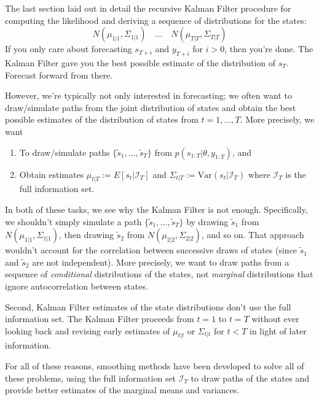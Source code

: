 \documentclass[a4paper,12pt]{article}
\begin{document}
The last section laid out in detail the recursive Kalman Filter
procedure for computing the likelihood and deriving a sequence of
distributions for the states:
\begin{equation}
  \label{distseq}
  N(\mu_{1|1}, \Sigma_{1|1}) \quad \ldots \quad  N(\mu_{T|T}, \Sigma_{T|T})
\end{equation}
If you only care about forecasting $s_{T+i}$ and $y_{T+i}$ for $i>0$,
then you're done.  The Kalman Filter gave you the best possible estimate
of the distribution of $s_T$.  Forecast forward from there.

However, we're typically not only interested in forecasting; we often
want to draw/simulate paths from the joint distribution of states and
obtain the best possible estimates of the distribution of states
from $t=1,\ldots,T$. More precisely, we want 
\begin{enumerate}
  \item To draw/simulate paths $\{\tilde{s}_1,\ldots,\tilde{s}_T\}$
    from $p(s_{1:T}|\theta, y_{1:T})$, and 
  \item Obtain estimates $\mu_{t|T} := E[s_t|\mathcal{I}_T]$ and 
    $\Sigma_{t|T} := \text{Var}(s_t|\mathcal{I}_T)$ where
    $\mathcal{I}_T$ is the full information set.
\end{enumerate}

In both of these tasks, we see why the Kalman Filter is not enough.
Specifically, we shouldn't simply simulate a path
$\{\tilde{s}_1,\ldots,\tilde{s}_T\}$ by drawing $\tilde{s}_1$ from
$N(\mu_{1|1}, \Sigma_{1|1})$, then drawing $\tilde{s}_2$ from
$N(\mu_{2|2}, \Sigma_{2|2})$, and so on. That approach wouldn't account
for the correlation between successive draws of states (since
$\tilde{s}_1$ and $\tilde{s}_2$ are not independent). More precisely, we
want to draw paths from a sequence of \emph{conditional} distributions
of the states, not \emph{marginal} distributions that ignore
autocorrelation between states.

Second, Kalman Filter estimates of the state distributions don't use the
full information set.  The Kalman Filter proceeds from $t=1$ to $t=T$
without ever looking back and revising early estimates of
$\mu_{t|t}$ or $\Sigma_{t|t}$ for $t<T$ in light of later
information. 

For all of these reasons, smoothing methods have been developed to solve
all of these problems, using the full information set $\mathcal{I}_T$ to
draw paths of the states and provide better estimates of the marginal
means and variances.
\end{document}
